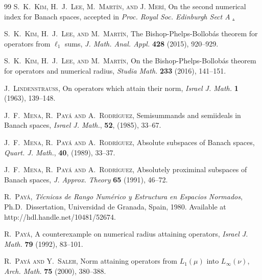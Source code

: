 \documentclass[10pt,a4paper]{amsart}
\theoremstyle{plain}
\theoremstyle{definition}
\begin{document}
\begin{thebibliography}{99}
 \textsc{S.~K.~Kim, H.~J.~Lee, M.~Mart\'in, and J. Mer\'i}, On the second numerical index for Banach spaces, accepted in \emph{Proc. Royal Soc. Edinburgh Sect A} \href{ https://doi.org/10.1017/prm.2018.75}.
	
 \textsc{S.~K.~Kim, H.~J.~Lee, and M.~Mart\'in}, The Bishop-Phelps-Bollob\'{a}s theorem for operators from $\ell_1$ sums, \emph{J. Math. Anal. Appl.} \textbf{428} (2015), 920--929.

 \textsc{S.~K.~Kim, H.~J.~Lee, and M.~Mart\'in}, On the Bishop-Phelps-Bollob\'{a}s theorem for operators and numerical radius,
 \emph{Studia Math.} {\bf 233} (2016), 141--151.

 \textsc{J.~Lindenstrauss}, On operators which attain their norm, \emph{Israel J. Math.} {\bf 1} (1963), 139--148.

 \textsc{J.~F.~Mena, R.~Pay\'a and A.~Rodr\'iguez}, Semisummands and semiideals in Banach spaces, \emph{Israel J. Math.}, {\bf 52}, (1985), 33--67.

 \textsc{J.~F.~Mena, R.~Pay\'a and A.~Rodr\'iguez}, Absolute subspaces of Banach spaces, \emph{Quart. J. Math.}, {\bf 40}, (1989), 33--37.

 \textsc{J.~F.~Mena, R.~Pay\'a and A.~Rodr\'iguez}, Absolutely proximinal subspaces of Banach spaces, \emph{J. Approx. Theory} {\bf 65} (1991), 46--72.
	
 \textsc{R.~Pay\'a}, {\it T\'ecnicas de Rango Num\'erico y Estructura en Espacios Normados}, Ph.D.\ Dissertation, Universidad de Granada, Spain, 1980. Available at http://hdl.handle.net/10481/52674. 

 \textsc{R.~Pay\'a}, A counterexample on numerical radius attaining operators, \emph{Israel J. Math.} {\bf 79} (1992), 83--101.


 \textsc{R.~Pay\'a and Y.~Saleh}, Norm attaining operators from $L_1(\mu)$ into $L_{\infty}(\nu)$, \emph{Arch. Math.} {\bf 75} (2000),  380--388.

\end{thebibliography}
\end{document}
